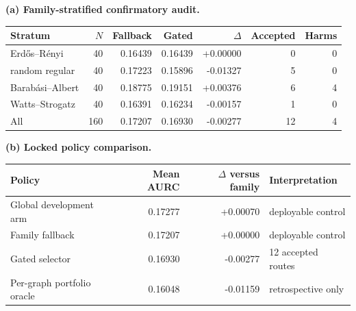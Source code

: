 \begin{minipage}{\textwidth}
\textbf{(a) Family-stratified confirmatory audit.}\par\smallskip
\begin{tabular}{@{}lrrrrrr@{}}
\toprule
Stratum & $N$ & Fallback & Gated & $\Delta$ & Accepted & Harms \\
\midrule
Erd\H{o}s--R\'enyi & 40 & 0.16439 & 0.16439 & +0.00000 & 0 & 0 \\
random regular & 40 & 0.17223 & 0.15896 & -0.01327 & 5 & 0 \\
Barab\'asi--Albert & 40 & 0.18775 & 0.19151 & +0.00376 & 6 & 4 \\
Watts--Strogatz & 40 & 0.16391 & 0.16234 & -0.00157 & 1 & 0 \\
\midrule
All & 160 & 0.17207 & 0.16930 & -0.00277 & 12 & 4 \\
\bottomrule
\end{tabular}
\par\medskip
\textbf{(b) Locked policy comparison.}\par\smallskip
\begin{tabular}{@{}lrrl@{}}
\toprule
Policy & Mean AURC & $\Delta$ versus family & Interpretation \\
\midrule
Global development arm & 0.17277 & +0.00070 & deployable control \\
Family fallback & 0.17207 & +0.00000 & deployable control \\
Gated selector & 0.16930 & -0.00277 & 12 accepted routes \\
Per-graph portfolio oracle & 0.16048 & -0.01159 & retrospective only \\
\bottomrule
\end{tabular}
\end{minipage}
